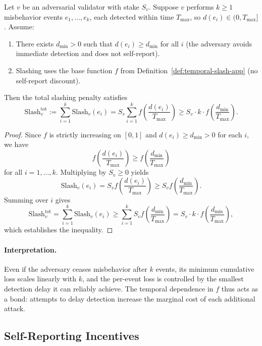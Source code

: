 \documentclass[11pt]{article}
\begin{document}
\begin{lemma}
\label{lem:attack-cost-app}
Let \(v\) be an adversarial validator with stake \(S_v\). Suppose \(v\) performs \(k \ge 1\) misbehavior events \(e_1,\dots,e_k\), each detected within time \(T_{\max}\), so \(d(e_i)\in(0,T_{\max}]\). Assume:
\begin{enumerate}[leftmargin=*]
  \item There exists \(d_{\min} > 0\) such that \(d(e_i) \ge d_{\min}\) for all \(i\) (the adversary avoids immediate detection and does not self-report).
  \item Slashing uses the base function \(f\) from Definition~\ref{def:temporal-slash-app} (no self-report discount).
\end{enumerate}
Then the total slashing penalty satisfies
\[
\mathrm{Slash}^{\mathrm{tot}}_v
:= \sum_{i=1}^k \mathrm{Slash}_v(e_i)
= S_v \sum_{i=1}^k f\!\left(\frac{d(e_i)}{T_{\max}}\right)
\ge S_v \cdot k \cdot f\!\left(\frac{d_{\min}}{T_{\max}}\right).
\]
\end{lemma}

\begin{proof}
Since \(f\) is strictly increasing on \([0,1]\) and \(d(e_i) \ge d_{\min} > 0\) for each \(i\), we have
\[
f\!\left(\frac{d(e_i)}{T_{\max}}\right)
\ge f\!\left(\frac{d_{\min}}{T_{\max}}\right)
\]
for all \(i = 1,\dots,k\). Multiplying by \(S_v \ge 0\) yields
\[
\mathrm{Slash}_v(e_i)
= S_v f\!\left(\frac{d(e_i)}{T_{\max}}\right)
\ge S_v f\!\left(\frac{d_{\min}}{T_{\max}}\right).
\]
Summing over \(i\) gives
\[
\mathrm{Slash}^{\mathrm{tot}}_v
= \sum_{i=1}^k \mathrm{Slash}_v(e_i)
\ge \sum_{i=1}^k S_v f\!\left(\frac{d_{\min}}{T_{\max}}\right)
= S_v \cdot k \cdot f\!\left(\frac{d_{\min}}{T_{\max}}\right),
\]
which establishes the inequality.
\end{proof}

\paragraph{Interpretation.}
Even if the adversary ceases misbehavior after \(k\) events, its minimum cumulative loss scales linearly with \(k\), and the per-event loss is controlled by the smallest detection delay it can reliably achieve. The temporal dependence in \(f\) thus acts as a bond: attempts to delay detection increase the marginal cost of each additional attack.

\subsection{Self-Reporting Incentives}
\end{document}

